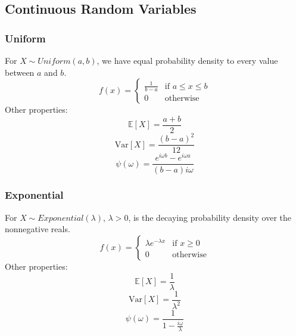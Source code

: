 \documentclass[twoside,twocolumn]{article}
\begin{document}
\subsection{Continuous Random Variables}
\subsubsection{Uniform}
For $X\sim Uniform(a,b)$, we have equal probability density to every value
between $a$ and $b$.
\begin{equation}
  f(x) = \begin{cases} \frac{1}{b-a} & \textrm{if } a \leq x \leq b \\ 0 & \textrm{otherwise} \end{cases}
\end{equation}
Other properties:
\begin{equation}
  \mathbb { E }[X] = \frac{a+b}{2}
\end{equation}
\begin{equation}
  \mbox{Var}[X] = \frac{(b-a)^2}{12}
\end{equation}
\begin{equation}
  \psi(\omega) = \displaystyle\frac{e^{i\omega b}-e^{i\omega a}}{(b-a)i\omega}
\end{equation}
\subsubsection{Exponential}
For $X\sim Exponential(\lambda)$, $\lambda > 0$, is the
decaying probability density over the nonnegative reals.
\begin{equation}
  f(x) = \begin{cases} \lambda e^{-\lambda x} & \textrm{if } x \geq 0 \\ 0 & \textrm{otherwise} \end{cases}
\end{equation}
Other properties:
\begin{equation}
  \mathbb { E }[X] = \frac{1}{\lambda}
\end{equation}
\begin{equation}
  \mbox{Var}[X] = \frac{1}{\lambda^2}
\end{equation}
\begin{equation}
  \psi(\omega) = \displaystyle\frac{1}{1-\frac{i\omega}{\lambda}}
\end{equation}
\end{document}
